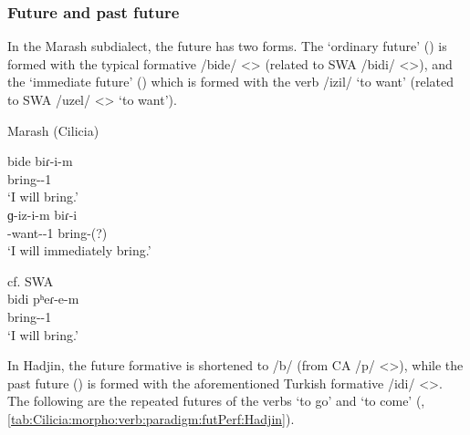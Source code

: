 \subsubsection{Future and past future}
\largerpage
{}

In the Marash subdialect, the future has two forms. The `ordinary future' () is formed with the typical formative /bide/ <> (related to SWA /bidi/ <>), and the `immediate future' () which is formed with the verb /izil/ `to want' (related to SWA /uzel/ <> `to want').

\begin{exe}
	\ex\label{sent:Cilicia:morpho:verb:fut:marash} \begin{xlist}
		\ex Marash (Cilicia) 
		\begin{xlist}
			\ex \gll bide biɾ-i-m \\
			{\fut} bring-{\thgloss}-1{\sg} \\
			\trans `I will bring.' \\ 
			\ex \gll ɡ-iz-i-m biɾ-i \\
			{\ind}-want-{\thgloss}-1{\sg} bring-{\thgloss}(?) \\
			\trans `I will immediately bring.' \\ 
			
		\end{xlist}
		\ex cf. SWA \\
		 \gll bidi pʰeɾ-e-m \\
		{\fut} bring-{\thgloss}-1{\sg} \\
		\trans `I will bring.' \\ 
	\end{xlist} 
\end{exe}


In Hadjin, the future formative is shortened to /b/ (from CA /p/ <>), while the past future () is formed with the aforementioned Turkish formative /idi/ <>. The following are the repeated futures of the verbs `to go' and `to come' (, \ref{tab:Cilicia:morpho:verb:paradigm:futPerf:Hadjin}).




